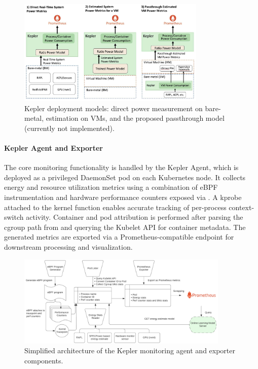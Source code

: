 \begin{figure}[ht]
  \centering
  \includegraphics[width=0.8\textwidth]{Figures/kepler_deployment_modes.jpg}
  \caption{Kepler deployment models: direct power measurement on bare-metal, estimation on VMs, and the proposed passthrough model (currently not implemented).}
  \label{fig:kepler-deployment-modes}
\end{figure}

\paragraph{Kepler Agent and Exporter}
The core monitoring functionality is handled by the Kepler Agent, which is deployed as a privileged DaemonSet pod on each Kubernetes node. It collects energy and resource utilization metrics using a combination of eBPF instrumentation and hardware performance counters exposed via . A kprobe attached to the  kernel function enables accurate tracking of per-process context-switch activity. Container and pod attribution is performed after parsing the cgroup path from  and querying the Kubelet API for container metadata. The generated metrics are exported via a Prometheus-compatible endpoint for downstream processing and visualization.

\begin{figure}[ht]
  \centering
  \includegraphics[width=0.9\textwidth]{Figures/kepler_architecture.png}
  \caption{Simplified architecture of the Kepler monitoring agent and exporter components.}
  \label{fig:kepler-architecture}
\end{figure}



